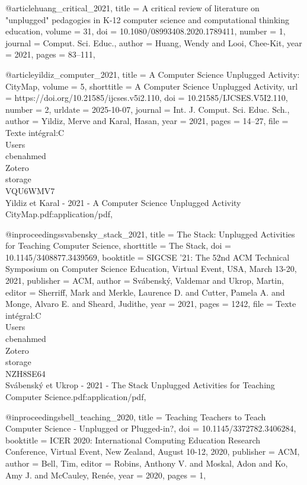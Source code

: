 @article{huang_critical_2021,
	title = {A critical review of literature on "unplugged" pedagogies in {K}-12 computer science and computational thinking 
education},
	volume = {31},
	doi = {10.1080/08993408.2020.1789411},
	number = {1},
	journal = {Comput. Sci. Educ.},
	author = {Huang, Wendy and Looi, Chee-Kit},
	year = {2021},
	pages = {83--111},
}

@article{yildiz_computer_2021,
	title = {A {Computer} {Science} {Unplugged} {Activity}: {CityMap}},
	volume = {5},
	shorttitle = {A {Computer} {Science} {Unplugged} {Activity}},
	url = {https://doi.org/10.21585/ijcses.v5i2.110},
	doi = {10.21585/IJCSES.V5I2.110},
	number = {2},
	urldate = {2025-10-07},
	journal = {Int. J. Comput. Sci. Educ. Sch.},
	author = {Yildiz, Merve and Karal, Hasan},
	year = {2021},
	pages = {14--27},
	file = {Texte intégral:C\:\\Users\\cbenahmed\\Zotero\\storage\\VQU6WMV7\\Yildiz et Karal - 2021 - A Computer Science 
Unplugged Activity CityMap.pdf:application/pdf},
}

@inproceedings{svabensky_stack_2021,
	title = {The {Stack}: {Unplugged} {Activities} for {Teaching} {Computer} {Science}},
	shorttitle = {The {Stack}},
	doi = {10.1145/3408877.3439569},
	booktitle = {{SIGCSE} '21: {The} 52nd {ACM} {Technical} {Symposium} on {Computer} {Science} {Education}, {Virtual} 
{Event}, {USA}, {March} 13-20, 2021},
	publisher = {ACM},
	author = {Svábenský, Valdemar and Ukrop, Martin},
	editor = {Sherriff, Mark and Merkle, Laurence D. and Cutter, Pamela A. and Monge, Alvaro E. and Sheard, Judithe},
	year = {2021},
	pages = {1242},
	file = {Texte intégral:C\:\\Users\\cbenahmed\\Zotero\\storage\\NZH8SE64\\Svábenský et Ukrop - 2021 - The Stack Unplugged 
Activities for Teaching Computer Science.pdf:application/pdf},
}

@inproceedings{bell_teaching_2020,
	title = {Teaching {Teachers} to {Teach} {Computer} {Science} - {Unplugged} or {Plugged}-in?},
	doi = {10.1145/3372782.3406284},
	booktitle = {{ICER} 2020: {International} {Computing} {Education} {Research} {Conference}, {Virtual} {Event}, {New} 
{Zealand}, {August} 10-12, 2020},
	publisher = {ACM},
	author = {Bell, Tim},
	editor = {Robins, Anthony V. and Moskal, Adon and Ko, Amy J. and McCauley, Renée},
	year = {2020},
	pages = {1},
}

